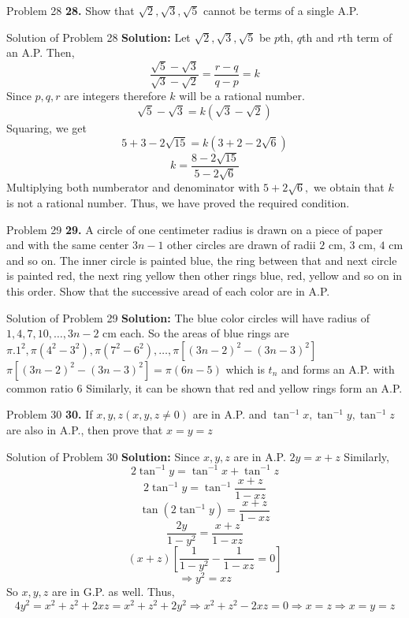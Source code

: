 \documentclass[aspectratio=1610,8pt]{beamer}
\begin{document}
\begin{frame}{Problem 28}
  \textbf{28.} Show that $\sqrt{2}, \sqrt{3}, \sqrt{5}$ cannot be terms of a single A.P.
\end{frame}
\begin{frame}{Solution of Problem 28}
  \textbf{Solution:} Let $\sqrt{2}, \sqrt{3}, \sqrt{5}$ be $p$th, $q$th and $r$th term of an A.P. Then,
  $$\frac{\sqrt{5} - \sqrt{3}}{\sqrt{3} - \sqrt{2}} = \frac{r - q}{q - p} = k$$
  Since $p, q, r$ are integers therefore $k$ will be a rational number.
  $$\sqrt{5}- \sqrt{3} = k(\sqrt{3}- \sqrt{2})$$
  Squaring, we get
  $$5 + 3 - 2\sqrt{15} = k(3 + 2 - 2\sqrt{6})$$
  $$k = \frac{8 - 2\sqrt{15}}{5 - 2\sqrt{6}}$$
  Multiplying both numberator and denominator with $5 + 2\sqrt{6},$ we obtain that $k$ is not a rational number. Thus, we have
  proved the required condition.
\end{frame}
\begin{frame}{Problem 29}
  \textbf{29.} A circle of one centimeter radius is drawn on a piece of paper and with the same center $3n - 1$ other circles are
  drawn of radii $2$ cm, $3$ cm, $4$ cm and so on. The inner circle is painted blue, the ring between that and next circle is
  painted red, the next ring yellow then other rings blue, red, yellow and so on in this order. Show that the successive aread of
  each color are in A.P.
\end{frame}
\begin{frame}{Solution of Problem 29}
  \textbf{Solution:} The blue color circles will have radius of $1, 4, 7, 10, \ldots, 3n - 2$ cm each.
  \linebreak\linebreak
  So the areas of blue rings are $\pi.1^2, \pi(4^2 - 3^2), \pi(7^2 - 6^2), \ldots, \pi[(3n -2)^2 - (3n - 3)^2]$
  \linebreak\linebreak
  $\pi[(3n -2)^2 - (3n - 3)^2] = \pi(6n - 5)$ which is $t_n$ and forms an A.P. with common ratio $6$
  \linebreak\linebreak
  Similarly, it can be shown that red and yellow rings form an A.P.
\end{frame}
\begin{frame}{Problem 30}
  \textbf{30.} If $x, y, z(x, y, z\neq 0)$ are in A.P. and $\tan^{-1}x, \tan^{-1}y, \tan^{-1}z$ are also in A.P., then prove that
  $x = y = z$
\end{frame}
\begin{frame}{Solution of Problem 30}
  \textbf{Solution:} Since $x, y, z$ are in A.P. $2y = x + z$
  Similarly, $$2\tan^{-1}y = \tan^{-1}x + \tan^{-1}z$$
  $$2\tan^{-1}y = \tan^{-1}\frac{x + z}{1 - xz}$$
  $$\tan(2\tan^{-1}y) = \frac{x + z}{1 - xz}$$
  $$\frac{2y}{1 - y^2} = \frac{x + z}{1 - xz}$$
  $$(x + z)\left[\frac{1}{1- y^2} - \frac{1}{1 - xz} = 0\right]$$
  $$\Rightarrow y^2 = xz$$
  So $x, y, z$ are in G.P. as well. Thus,
  $$4y^2 = x^2 + z^2 + 2xz = x^2 + z^2 + 2y^2 \Rightarrow x^2 + z^2 - 2xz = 0 \Rightarrow x = z \Rightarrow x = y = z$$
\end{frame}
\end{document}

